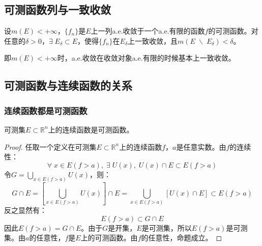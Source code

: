 \subsection{可测函数列与一致收敛}
\begin{theorem}[叶戈罗夫定理]
	设$m(E)<+\infty$，$\{f_n\}$是$E$上一列a.e.收敛于一个a.e.有限的函数$f$的可测函数。对任意的$\delta>0$，$\exists\;E_\delta\subset E$，使得$\{f_n\}$在$E_\delta$上一致收敛，且$m(E\;\backslash\;E_\delta)<\delta$。
\end{theorem}
即$m(E)<+\infty$时，a.e.收敛在收敛对象a.e.有限的时候基本上一致收敛。

\subsection{可测函数与连续函数的关系}
\subsubsection{连续函数都是可测函数}
\begin{theorem}
	可测集$E\subset\mathbb{R}^n$上的连续函数是可测函数。
\end{theorem}
\begin{proof}
	任取一个定义在可测集$E\subset\mathbb{R}^{n}$上的连续函数$f$，$a$是任意实数。由$f$的连续性：
	\begin{equation*}
		\forall\;x\in E(f>a),\;\exists\;U(x),\;U(x)\cap E\subset E(f>a)
	\end{equation*}
	令$G=\bigcup\limits_{x\in E(f>a)}U(x)$，则：
	\begin{equation*}
		G\cap E=\left[\bigcup_{x\in E(f>a)}U(x)\right]\cap E=\bigcup_{x\in E(f>a)}\left[U(x)\cap E\right]\subset E(f>a)
	\end{equation*}
	反之显然有：
	\begin{equation*}
		E(f>a)\subset G\cap E
	\end{equation*}
	因此$E(f>a)=G\cap E$。由于$G$是开集，$E$是可测集，所以$E(f>a)$是可测集。由$a$的任意性，$f$是$E$上的可测函数。由$f$的任意性，命题成立。
\end{proof}
